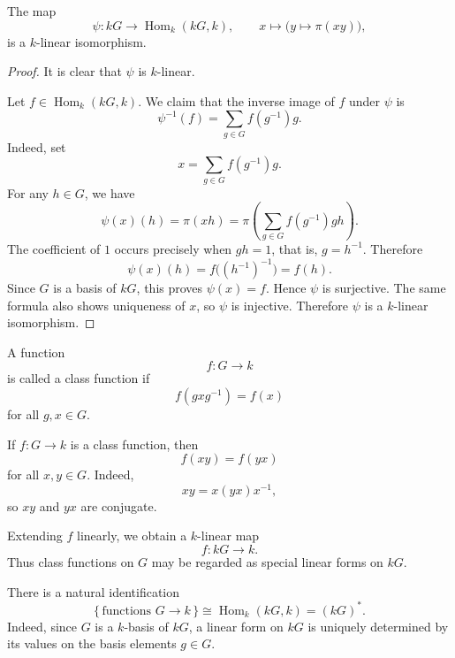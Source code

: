 \begin{lemma}
    The map
    \[
        \psi:kG\longrightarrow \operatorname{Hom}_k(kG,k),
        \qquad
        x\longmapsto \bigl(y\mapsto \pi(xy)\bigr),
    \]
    is a \(k\)-linear isomorphism.
\end{lemma}

\begin{proof}
    It is clear that \(\psi\) is \(k\)-linear.

    Let \(f\in \operatorname{Hom}_k(kG,k)\). We claim that the inverse image of
    \(f\) under \(\psi\) is
    \[
        \psi^{-1}(f)
        =
        \sum_{g\in G} f(g^{-1})g.
    \]
    Indeed, set
    \[
        x=\sum_{g\in G} f(g^{-1})g.
    \]
    For any \(h\in G\), we have
    \[
        \psi(x)(h)
        =
        \pi(xh)
        =
        \pi\left(
        \sum_{g\in G} f(g^{-1})gh
        \right).
    \]
    The coefficient of \(1\) occurs precisely when \(gh=1\), that is,
    \(g=h^{-1}\). Therefore
    \[
        \psi(x)(h)
        =
        f\bigl((h^{-1})^{-1}\bigr)
        =
        f(h).
    \]
    Since \(G\) is a basis of \(kG\), this proves \(\psi(x)=f\). Hence \(\psi\) is
    surjective. The same formula also shows uniqueness of \(x\), so \(\psi\) is
    injective. Therefore \(\psi\) is a \(k\)-linear isomorphism.
\end{proof}

\begin{definition}
    A function
    \[
        f:G\longrightarrow k
    \]
    is called a class function if
    \[
        f(gxg^{-1})=f(x)
    \]
    for all \(g,x\in G\).
\end{definition}

\begin{remark}
    If \(f:G\to k\) is a class function, then
    \[
        f(xy)=f(yx)
    \]
    for all \(x,y\in G\). Indeed,
    \[
        xy=x(yx)x^{-1},
    \]
    so \(xy\) and \(yx\) are conjugate.

    Extending \(f\) linearly, we obtain a \(k\)-linear map
    \[
        f:kG\longrightarrow k.
    \]
    Thus class functions on \(G\) may be regarded as special linear forms on
    \(kG\).
\end{remark}

\begin{remark}
    There is a natural identification
    \[
        \{\,\text{functions }G\to k\,\}
        \cong
        \operatorname{Hom}_k(kG,k)
        =
        (kG)^*.
    \]
    Indeed, since \(G\) is a \(k\)-basis of \(kG\), a linear form on \(kG\) is
    uniquely determined by its values on the basis elements \(g\in G\).
\end{remark}

